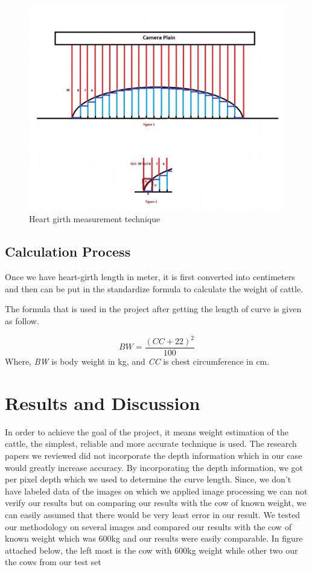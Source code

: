 \documentclass{article}
\begin{document}
\begin{figure}[h]
    \centering
    \includegraphics [scale=0.5] {h_g_m}
    \caption{Heart girth measurement technique}
    \end{figure}


\subsection{Calculation Process}
Once we have heart-girth length in meter, it is first converted into centimeters and then can be put in the standardize formula to calculate the weight of cattle.

The formula that is used in the project after getting the length of curve is given as follow.

\begin{equation}
    BW = \frac{ (CC + 22)^{2}}{100}
\end{equation}
Where, \textit{BW }is body weight in kg, and \textit{CC} is chest circumference in cm.
\section{Results and Discussion}
\label{sec:typestyle}

In order to achieve the goal of the project, it means weight estimation of the cattle, the simplest, reliable and more accurate technique is used. The research papers we reviewed did not incorporate the depth information which
in our case would greatly increase accuracy. By incorporating the depth information, we got per pixel depth which we used to determine the curve length. 
Since, we don't have labeled data of the images on which we applied image processing we can not verify our results but on comparing our results with the cow of known weight, we can easily assumed that there would be very least error in our result. 
We tested our methodology on several images and compared our results with the cow of known weight which was 600kg and our results were easily comparable. 
In figure attached below, the left most is the cow with 600kg weight while other two our the cows from our test set 
\end{document}
